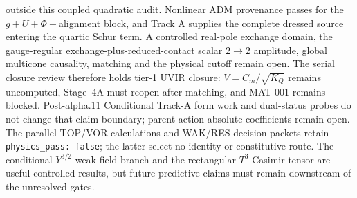 ﻿\documentclass[11pt]{article}
\newcommand{\Tthree}{T^3}
\begin{document}
outside this coupled quadratic audit.  Nonlinear ADM provenance passes for
the $g+U+\Phi+$alignment block, and Track A supplies the complete dressed
source entering the quartic Schur term.  A controlled real-pole exchange
domain, the gauge-regular exchange-plus-reduced-contact scalar $2\to2$
amplitude, global multicone
causality, matching and the physical cutoff remain open.  The serial closure
review therefore holds tier-1 UVIR closure: $V=C_m/\sqrt{K_Q}$ remains
uncomputed, Stage~4A must reopen after matching, and MAT-001 remains blocked.
Post-alpha.11 Conditional Track-A form work and dual-status probes do not
change that claim boundary; parent-action absolute coefficients remain open.
The parallel TOP/VOR calculations and WAK/RES decision packets retain
\texttt{physics\_pass: false}; the latter select no identity or constitutive
route.  The conditional $Y^{3/2}$ weak-field branch and
the rectangular-$\Tthree$ Casimir tensor are useful controlled results, but
future predictive claims must remain downstream of the unresolved gates.


\end{document}
